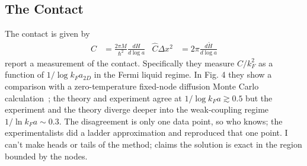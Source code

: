 \subsection{The Contact}\label{sec:contact}

The contact is given by~\cite{PhysRevA.86.013626}
\begin{align}
	\hat{C} &= \frac{2 \pi M}{\hbar^2} \frac{dH}{d\log a}
	&
	\hat{C}\Delta x^2 &= 2\pi \frac{d\tilde{H}}{d\log a} 
	\label{eq:contact}
\end{align}
 report a measurement of the contact.
Specifically they measure $C/k_F^2$ as a function of $1/\log k_F a_{2D}$ in the Fermi liquid regime.
In  Fig. 4 they show a comparison with a zero-temperature fixed-node diffusion Monte Carlo calculation~\cite{PhysRevLett.106.110403}; the theory and experiment agree at $1/\log k_F a \gtrsim 0.5$ but the experiment and the theory diverge deeper into the weak-coupling regime $1/\ln k_F a \sim 0.3$.
The disagreement is only one data point, so who knows; the experimentalists did a ladder approximation and reproduced that one point.
I can't make heads or tails of the method;  claims the solution is exact in the region bounded by the nodes.

